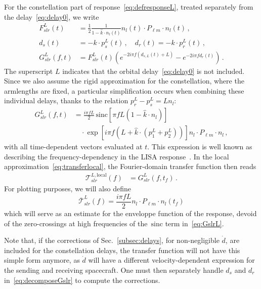 \documentclass[aps,showpacs,twocolumn,prd,superscriptaddress,nofootinbib]{revtex4-1}
\newcommand{\be}{\begin{equation}}
\newcommand{\ee}{\end{equation}}
\newcommand\calT{{\mathcal{T}}}
\newcommand{\nn}{\nonumber}
\newcommand{\hatk}{\hat{k}}
\newcommand{\sinc}{\,\mathrm{sinc}}
\newcommand{\tf}{t_{f}}
\begin{document}
For the constellation part of response~\eqref{eq:defresponseL}, treated separately from the delay~\eqref{eq:delay0}, we write
\begin{align}\label{eq:decomposeGslr}
	F_{slr}^{L}(t) &= \frac{1}{2} \frac{1}{1 - \hatk\cdot n_{l}(t)} n_{l}(t) \cdot P_{\ell m} \cdot n_{l} (t) \,,\nn\\
	d_{s}(t) &= - k\cdot p_{s}^{L}(t) \,, \quad d_{r}(t) = - k\cdot p_{r}^{L}(t) \,,\nn\\
	G_{slr}^{L}(f,t) &=  F_{slr}^{L}(t) \left( e^{-2i\pi f (d_{s,L}(t) + L)} - e^{-2i\pi f d_{r}(t)} \right) \,.
\end{align}
The superscript $L$ indicates that the orbital delay~\eqref{eq:delay0} is not included. Since we also assume the rigid approximation for the constellation, where the armlengths are fixed, a particular simplification occurs when combining these individual delays, thanks to the relation $p^{L}_{r} - p^{L}_{s} =  L n_{l}$:
\begin{align}\label{eq:GslrL}
	G_{slr}^{L}(f,t) &= \frac{i \pi f L}{2} \sinc \left[ \pi f L\left(1-\hatk\cdot n_{l} \right) \right] \nn\\
	& \quad \cdot \exp\left[ i \pi f \left( L + \hatk\cdot \left( p_{1}^{L} + p_{2}^{L} \right) \right) \right]  n_{l} \cdot P_{\ell m} \cdot n_{l} \,,
\end{align}
with all time-dependent vectors evaluated at $t$. This expression is well known as describing the frequency-dependency in the LISA response~\cite{Larson+99, Cornish01, CR02, RCP04}. In the local approximation~\eqref{eq:transferlocal}, the Fourier-domain transfer function then reads
\begin{align}\label{eq:transferLlocal}
	\calT_{slr}^{L, \mathrm{local}}(f) &= G_{slr}^{L}(f, \tf) \,.
\end{align}
For plotting purposes, we will also define
\be\label{eq:transferLenvelope}
	\overline{\calT}_{slr}^{L} (f) = \frac{i \pi f L}{2} n_{l} \cdot P_{\ell m} \cdot n_{l} (\tf)
\ee
which will serve as an estimate for the enveloppe function of the response, devoid of the zero-crossings at high frequencies of the $\sinc$ term in~\eqref{eq:GslrL}.

Note that, if the corrections of Sec.~\ref{subsec:delays}, for non-negligible $\dot d$, are included for the constellation delays, the transfer function will not have this simple form anymore, as $\dot{d}$ will have a different velocity-dependent expression for the sending and receiving spacecraft. One must then separately handle $d_{s}$ and $d_{r}$ in~\eqref{eq:decomposeGslr} to compute the corrections.
\end{document}
